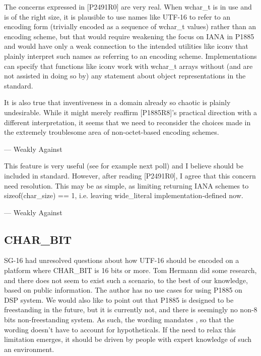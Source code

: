 \documentclass{wg21}
\begin{document}
\begin{quoteblock}
    The concerns expressed in [P2491R0] are very real. When wchar_t is in use and is of the right size, it is plausible to use names like UTF-16 to refer to an encoding form (trivially encoded as a sequence of wchar_t values) rather than an encoding scheme, but that would require weakening the focus on IANA in P1885 and would have only a weak connection to the intended utilities like iconv that plainly interpret such names as referring to an encoding scheme. Implementations can specify that functions like iconv work with wchar_t arrays without (and are not assisted in doing so by) any statement about object representations in the standard.
    
    It is also true that inventiveness in a domain already so chaotic is plainly undesirable. While it might merely reaffirm [P1885R8]'s practical direction with a different interpretation, it seems that we need to reconsider the choices made in the extremely troublesome area of non-octet-based encoding schemes.
    
    — Weakly Against
\end{quoteblock}

\begin{quoteblock}
    This feature is very useful (see for example next poll) and I believe should be included in standard. However, after reading [P2491R0], I agree that this concern need resolution. This may be as simple, as limiting returning IANA schemes to sizeof(char_size) == 1, i.e. leaving wide_literal implementation-defined now.
    
    — Weakly Against
\end{quoteblock}


\subsection{CHAR_BIT}
SG-16 had unresolved questions about how UTF-16 should be encoded on a platform where CHAR_BIT is 16 bits or more.
Tom Hermann did some research, and there does not seem to exist such a scenario, to the best of our knowledge, based on public information.
The author has no use cases for using P1885 on DSP system.
We would also like to point out that P1885 is designed to be freestanding in the future, but it is currently not, and there is seemingly no non-8 bits
non-freestanding system.
As such, the wording mandates , so that the wording doesn't have to account for hypotheticals.
If the need to relax this limitation emerges, it should be driven by people with expert knowledge of such an environment.
\end{document}
